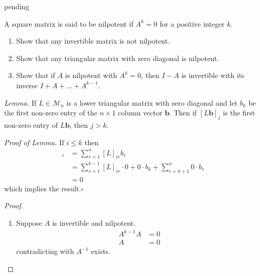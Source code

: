 \begin{exercise} \label{E.1.26}
    pending
\end{exercise}

\begin{exercise} \label{E.1.27}
    A square matrix is said to be nilpotent if \( A^k = 0 \) for a positive integer \( k \). 
    \begin{enumerate}
        \item Show that any invertible matrix is not nilpotent.
        
        \item Show that any triangular matrix with zero diagonal is nilpotent.
        
        \item Show that if \( A \) is nilpotent with \( A^k = 0 \), then \( I-A \) is invertible with its inverse \( I + A + \ldots + A^{k-1} \). 
    \end{enumerate}
    
    \emph{Lemma.}
    If \( L \in \mathcal{M}_n\) is a lower triangular matrix with zero diagonal and let \( b_k \) be the first non-zero entry of the \( n \times 1 \) column vector \( \mathbf{b} \). Then if \( [L\mathbf{b}]_j \) is the first non-zero entry of \( L\mathbf{b} \), then \( j > k \). 
    
    \noindent \emph{Proof of Lemma.} If \( i \leq k \) then
    \begin{align*}
        [Lb]_i &= \sum_{r=1}^n [L]_{ir}b_r \\
        &= \sum_{r=1}^{k-1}[L]_{ir}\cdot 0 + 0 \cdot b_k + \sum_{r=k+1}^n 0 \cdot b_r \\
        &= 0
    \end{align*}
    which implies the result.\( \square \)
    
    \begin{proof}
        \begin{enumerate}
            \item Suppose \( A \) is invertible and nilpotent.
            \begin{align*}
                A^{k-1}A &= 0 \\
                A &= 0
            \end{align*}
            contradicting with \( A^{-1} \) exists.
            

\end{enumerate}
\end{proof}
\end{exercise}
